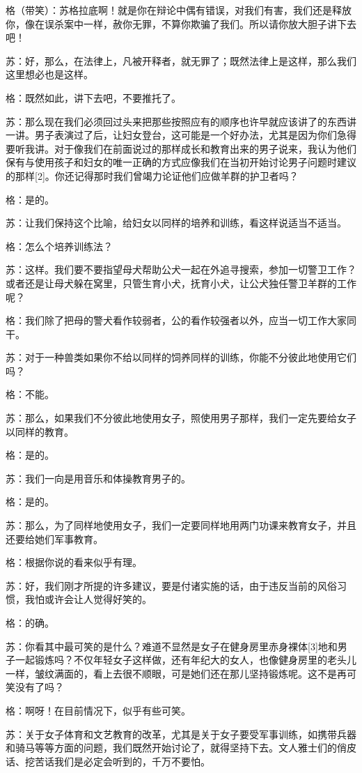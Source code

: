 \documentclass[12pt,oneside]{book}
\begin{document}
格（带笑）：苏格拉底啊！就是你在辩论中偶有错误，对我们有害，我们还是释放你，像在误杀案中一样，赦你无罪，不算你欺骗了我们。所以请你放大胆子讲下去吧！

苏：好，那么，在法律上，凡被开释者，就无罪了；既然法律上是这样，那么我们这里想必也是这样。

格：既然如此，讲下去吧，不要推托了。

苏：那么现在我们必须回过头来把那些按照应有的顺序也许早就应该讲了的东西讲一讲。男子表演过了后，让妇女登台，这可能是一个好办法，尤其是因为你们急得要听我讲。对于像我们在前面说过的那样成长和教育出来的男子说来，我认为他们保有与使用孩子和妇女的唯一正确的方式应像我们在当初开始讨论男子问题时建议的那样[2]。你还记得那时我们曾竭力论证他们应做羊群的护卫者吗？

格：是的。

苏：让我们保持这个比喻，给妇女以同样的培养和训练，看这样说适当不适当。

格：怎么个培养训练法？

苏：这样。我们要不要指望母犬帮助公犬一起在外追寻搜索，参加一切警卫工作？或者还是让母犬躲在窝里，只管生育小犬，抚育小犬，让公犬独任警卫羊群的工作呢？

格：我们除了把母的警犬看作较弱者，公的看作较强者以外，应当一切工作大家同干。

苏：对于一种兽类如果你不给以同样的饲养同样的训练，你能不分彼此地使用它们吗？

格：不能。

苏：那么，如果我们不分彼此地使用女子，照使用男子那样，我们一定先要给女子以同样的教育。

格：是的。

苏：我们一向是用音乐和体操教育男子的。

格：是的。

苏：那么，为了同样地使用女子，我们一定要同样地用两门功课来教育女子，并且还要给她们军事教育。

格：根据你说的看来似乎有理。

苏：好，我们刚才所提的许多建议，要是付诸实施的话，由于违反当前的风俗习惯，我怕或许会让人觉得好笑的。

格：的确。

苏：你看其中最可笑的是什么？难道不显然是女子在健身房里赤身裸体[3]地和男子一起锻炼吗？不仅年轻女子这样做，还有年纪大的女人，也像健身房里的老头儿一样，皱纹满面的，看上去很不顺眼，可是她们还在那儿坚持锻炼呢。这不是再可笑没有了吗？

格：啊呀！在目前情况下，似乎有些可笑。

苏：关于女子体育和文艺教育的改革，尤其是关于女子要受军事训练，如携带兵器和骑马等等方面的问题，我们既然开始讨论了，就得坚持下去。文人雅士们的俏皮话、挖苦话我们是必定会听到的，千万不要怕。
\end{document}
